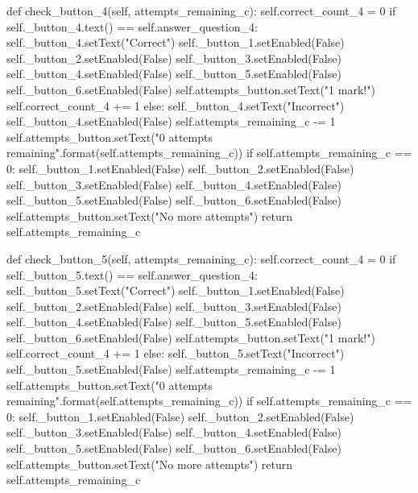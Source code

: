 \begin{landscape}
\begin{python}
    def check_button_4(self, attempts_remaining_c):
        self.correct_count_4 = 0
        if self._button_4.text() == self.answer_question_4:
            self._button_4.setText("Correct")
            self._button_1.setEnabled(False)
            self._button_2.setEnabled(False)
            self._button_3.setEnabled(False)
            self._button_4.setEnabled(False)
            self._button_5.setEnabled(False)
            self._button_6.setEnabled(False)
            self.attempts_button.setText("1 mark!")
            self.correct_count_4 += 1
        else:
            self._button_4.setText("Incorrect")
            self._button_4.setEnabled(False)
            self.attempts_remaining_c -= 1
            self.attempts_button.setText("{0} attempts remaining".format(self.attempts_remaining_c))
            if self.attempts_remaining_c == 0:
                self._button_1.setEnabled(False)
                self._button_2.setEnabled(False)
                self._button_3.setEnabled(False)
                self._button_4.setEnabled(False)
                self._button_5.setEnabled(False)
                self._button_6.setEnabled(False)
                self.attempts_button.setText("No more attempts")
            return self.attempts_remaining_c
                
    def check_button_5(self, attempts_remaining_c):
        self.correct_count_4 = 0
        if self._button_5.text() == self.answer_question_4:
            self._button_5.setText("Correct")
            self._button_1.setEnabled(False)
            self._button_2.setEnabled(False)
            self._button_3.setEnabled(False)
            self._button_4.setEnabled(False)
            self._button_5.setEnabled(False)
            self._button_6.setEnabled(False)
            self.attempts_button.setText("1 mark!")
            self.correct_count_4 += 1
        else:
            self._button_5.setText("Incorrect")
            self._button_5.setEnabled(False)
            self.attempts_remaining_c -= 1
            self.attempts_button.setText("{0} attempts remaining".format(self.attempts_remaining_c))
            if self.attempts_remaining_c == 0:
                self._button_1.setEnabled(False)
                self._button_2.setEnabled(False)
                self._button_3.setEnabled(False)
                self._button_4.setEnabled(False)
                self._button_5.setEnabled(False)
                self._button_6.setEnabled(False)
                self.attempts_button.setText("No more attempts")
            return self.attempts_remaining_c
                

\end{python}
\end{landscape}
